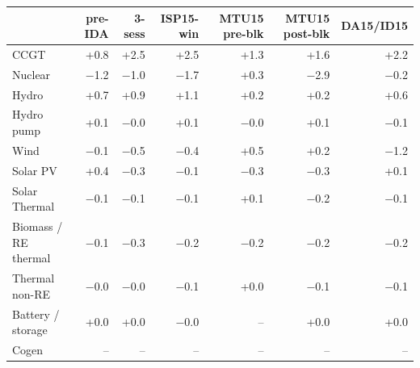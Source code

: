 \begin{tabular}{l r r r r r r }
\toprule
 & \textbf{pre-IDA} & \textbf{3-sess} & \textbf{ISP15-win} & \textbf{MTU15 pre-blk} & \textbf{MTU15 post-blk} & \textbf{DA15/ID15} \\
\midrule
CCGT & +0.8 & +2.5 & +2.5 & +1.3 & +1.6 & +2.2 \\
Nuclear & $-$1.2 & $-$1.0 & $-$1.7 & +0.3 & $-$2.9 & $-$0.2 \\
Hydro & +0.7 & +0.9 & +1.1 & +0.2 & +0.2 & +0.6 \\
Hydro pump & +0.1 & $-$0.0 & +0.1 & $-$0.0 & +0.1 & $-$0.1 \\
Wind & $-$0.1 & $-$0.5 & $-$0.4 & +0.5 & +0.2 & $-$1.2 \\
Solar PV & +0.4 & $-$0.3 & $-$0.1 & $-$0.3 & $-$0.3 & +0.1 \\
Solar Thermal & $-$0.1 & $-$0.1 & $-$0.1 & +0.1 & $-$0.2 & $-$0.1 \\
Biomass / RE thermal & $-$0.1 & $-$0.3 & $-$0.2 & $-$0.2 & $-$0.2 & $-$0.2 \\
Thermal non-RE & $-$0.0 & $-$0.0 & $-$0.1 & +0.0 & $-$0.1 & $-$0.1 \\
Battery / storage & +0.0 & +0.0 & $-$0.0 & -- & +0.0 & +0.0 \\
Cogen & -- & -- & -- & -- & -- & -- \\
\bottomrule
\end{tabular}
